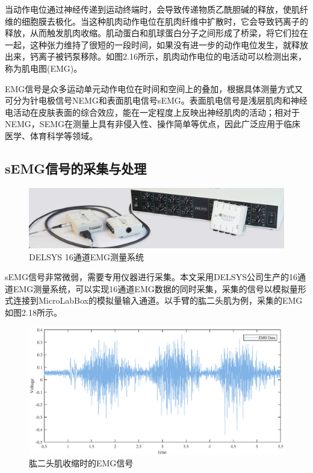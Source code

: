 当动作电位通过神经传递到运动终端时，会导致传递物质乙酰胆碱的释放，使肌纤维的细胞膜去极化。当这种肌肉动作电位在肌肉纤维中扩散时，它会导致钙离子的释放，从而触发肌肉收缩。肌动蛋白和肌球蛋白分子之间形成了桥梁，将它们拉在一起，这种张力维持了很短的一段时间，如果没有进一步的动作电位发生，就释放出来，钙离子被钙泵移除。如图2.16所示，肌肉动作电位的电活动可以检测出来，称为肌电图(EMG)。

EMG信号是众多运动单元动作电位在时间和空间上的叠加，根据具体测量方式又可分为针电极信号NEMG和表面肌电信号sEMG。表面肌电信号是浅层肌肉和神经电活动在皮肤表面的综合效应，能在一定程度上反映出神经肌肉的活动；相对于NEMG，SEMG在测量上具有非侵入性、操作简单等优点，因此广泛应用于临床医学、体育科学等领域。

\subsection{sEMG信号的采集与处理}
\begin{figure}[htb]
    \includegraphics[width=16cm]{fig/f44.jpg}
    \caption{DELSYS 16通道EMG测量系统}
    \label{fig:mark}
\end{figure}
sEMG信号非常微弱，需要专用仪器进行采集。本文采用DELSYS公司生产的16通道EMG测量系统，可以实现16通道EMG数据的同时采集，采集的信号以模拟量形式连接到MicroLabBox的模拟量输入通道。以手臂的肱二头肌为例，采集的EMG如图2.18所示。

\begin{figure}[htb]
    \includegraphics[width=17cm]{fig/f45.eps}
    \caption{肱二头肌收缩时的EMG信号}
    \label{fig:mark}
\end{figure}

